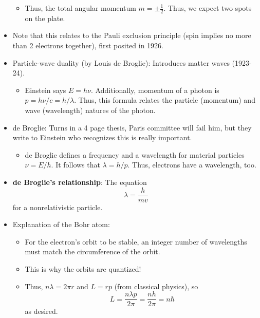\documentclass[../notes.tex]{subfiles}
\begin{document}
\begin{itemize}
\begin{itemize}
        \item Thus, the total angular momentum $m=\pm\frac{1}{2}$. Thus, we expect two spots on the plate.
    \end{itemize}
    \item Note that this relates to the Pauli exclusion principle (spin implies no more than 2 electrons together), first posited in 1926.
    \item Particle-wave duality (by Louis de Broglie): Introduces matter waves (1923-24).
    \begin{itemize}
        \item Einstein says $E=h\nu$. Additionally, momentum of a photon is $p=h\nu/c=h/\lambda$. Thus, this formula relates the particle (momentum) and wave (wavelength) natures of the photon.
    \end{itemize}
    \item de Broglie: Turns in a 4 page thesis, Paris committee will fail him, but they write to Einstein who recognizes this is really important.
    \begin{itemize}
        \item de Broglie defines a frequency and a wavelength for material particles $\nu=E/h$. It follows that $\lambda=h/p$. Thus, electrons have a wavelength, too.
    \end{itemize}
    \item \textbf{de Broglie's relationship}: The equation
    \begin{equation*}
        \lambda = \frac{h}{mv}
    \end{equation*}
    for a nonrelativistic particle.
    \item Explanation of the Bohr atom:
    \begin{itemize}
        \item For the electron's orbit to be stable, an integer number of wavelengths must match the circumference of the orbit.
        \item This is why the orbits are quantized!
        \item Thus, $n\lambda=2\pi r$ and $L=rp$ (from classical physics), so
        \begin{equation*}
            L = \frac{n\lambda p}{2\pi} = \frac{nh}{2\pi} = n\hbar
        \end{equation*}
        as desired.
    \end{itemize}
\end{itemize}
\end{document}
